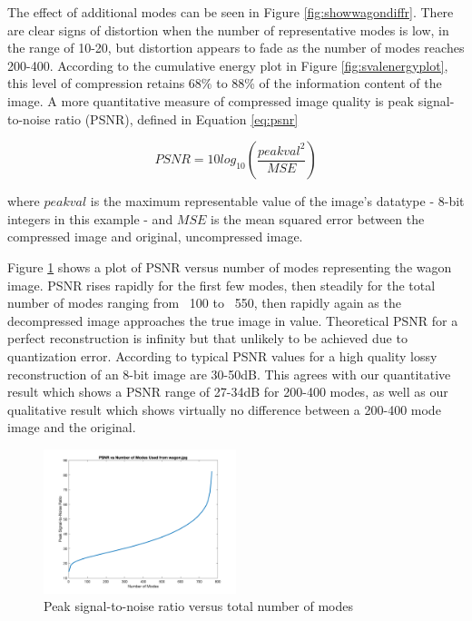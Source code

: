 \documentclass[conference]{IEEEtran}
\begin{document}
    The effect of additional modes can be seen in Figure \ref{fig:showwagondiffr}. There are clear signs of distortion when the number of representative modes is low, in the range of 10-20, but distortion appears to fade as the number of modes reaches 200-400. According to the cumulative energy plot in Figure \ref{fig:svalenergyplot}, this level of compression retains 68\% to 88\% of the information content of the image. A more quantitative measure of compressed image quality is peak signal-to-noise ratio (PSNR), defined in Equation \ref{eq:psnr}

    \begin{equation}
    		PSNR = 10log_{10}(\frac{peakval^2}{MSE})
    \label{eq:psnr}
    \end{equation}

    where $peakval$ is the maximum representable value of the image's datatype - 8-bit integers in this example - and $MSE$ is the mean squared error between the compressed image and original, uncompressed image.

    Figure \ref{fig:psnrvsr_wagon} shows a plot of PSNR versus number of modes representing the wagon image. PSNR rises rapidly for the first few modes, then steadily for the total number of modes ranging from ~100 to ~550, then rapidly again as the decompressed image approaches the true image in value. Theoretical PSNR for a perfect reconstruction is infinity but that unlikely to be achieved due to quantization error. According to \cite{psnr_quality} typical PSNR values for a high quality lossy reconstruction of an 8-bit image are 30-50dB. This agrees with our quantitative result which shows a PSNR range of 27-34dB for 200-400 modes, as well as our qualitative result which shows virtually no difference between a 200-400 mode image and the original.

    \begin{figure}[t]
    \includegraphics[width=0.5\textwidth]{snrvsr_wagon_rgb}
    \caption{Peak signal-to-noise ratio versus total number of modes}
    \label{fig:psnrvsr_wagon}
    \end{figure}
    
\end{document}
